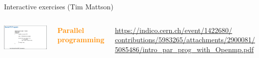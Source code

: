 \documentclass[aspectratio=169]{beamer}
\begin{document}
\begin{frame}{Interactive exercises (Tim Mattson)}
\vspace{0.25 cm}
\large
\begin{columns}
\includegraphics[width=\linewidth]{PLOTS/parallel-processing.png}

\textcolor{darkorange}{\bf Parallel programming}

\tiny
\vspace{0.2 cm}
\textcolor{blue}{\href{https://indico.cern.ch/event/1422680/contributions/5983265/attachments/2900081/5085486/intro_par_prog_with_Openmp.pdf}{https://indico.cern.ch/event/1422680/ \\
%
contributions/5983265/attachments/2900081/
%
5085486/intro\_par\_prog\_with\_Openmp.pdf}}

\small
\vspace{0.25 cm}

\vspace{0.25 cm}

\end{columns}
\end{frame}
\end{document}
